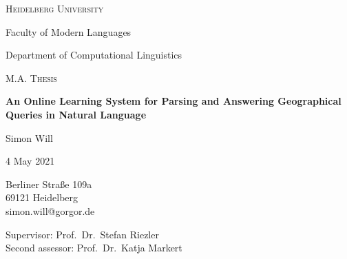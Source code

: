 \documentclass[12pt,a4paper,oneside,openright]{scrbook}
\begin{document}
\begin{titlepage}
  \centering\large
  {\scshape\LARGE
    Heidelberg University\par
    Faculty of Modern Languages\par
    Department of Computational Linguistics\par}
  \vspace{4em}
  {\scshape\Large M.A. Thesis\par}
  \vspace{2em}
  {\huge\bfseries An Online Learning System for Parsing and Answering
    Geographical Queries in Natural Language\par}
  \vspace{4em}
  {\Large
    Simon Will\par
    4 May 2021\par}
  \raggedright
  \vfill
  \vspace{4em}
  {\large
    Berliner Straße 109a\\
    69121 Heidelberg\\
    simon.will@gorgor.de\par}
  \vspace{1em}
  {\large
    Supervisor: Prof.~Dr.~Stefan Riezler\\
    Second assessor: Prof.~Dr.~Katja Markert}
\end{titlepage}

\frontmatter
\tableofcontents
\listoffigures
\listoftables





\mainmatter















\appendix





\backmatter

\printbibliography[nottype=online]

\printbibliography[type=online,title={Online Resources}]
\end{document}
